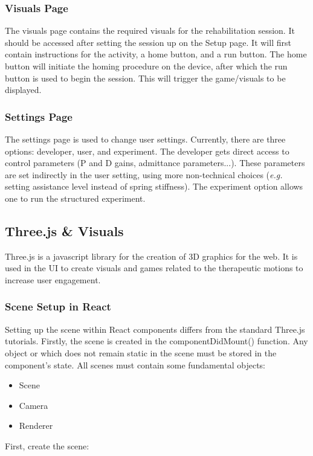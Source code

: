 \documentclass{article}
\begin{document}
	\subsubsection{Visuals Page}
	
	The visuals page contains the required visuals for the rehabilitation session. It should be accessed after setting the session up on the Setup page. It will first contain instructions for the activity, a home button, and a run button. The home button will initiate the homing procedure on the device, after which the run button is used to begin the session. This will trigger the game/visuals to be displayed. 
	
	\subsubsection{Settings Page}
	
	The settings page is used to change user settings. Currently, there are three options: developer, user, and experiment. The developer gets direct access to control parameters (P and D gains, admittance parameters...). These parameters are set indirectly in the user setting, using more non-technical choices (\textit{e.g.} setting assistance level instead of spring stiffness). The experiment option allows one to run the structured experiment. 
	
	\subsection{Three.js \& Visuals}
	
	Three.js is a javascript library for the creation of 3D graphics for the web. It is used in the UI to create visuals and games related to the therapeutic motions to increase user engagement.
	
		\subsubsection{Scene Setup in React}
			
			Setting up the scene within React components differs from the standard Three.js tutorials. Firstly, the scene is created in the componentDidMount() function. Any object or which does not remain static in the scene must be stored in the component's state. 
	All scenes must contain some fundamental objects:
	\begin{itemize}
		\item Scene
		\item Camera
		\item Renderer 
	\end{itemize}
	First, create the scene:
	
\end{document}
